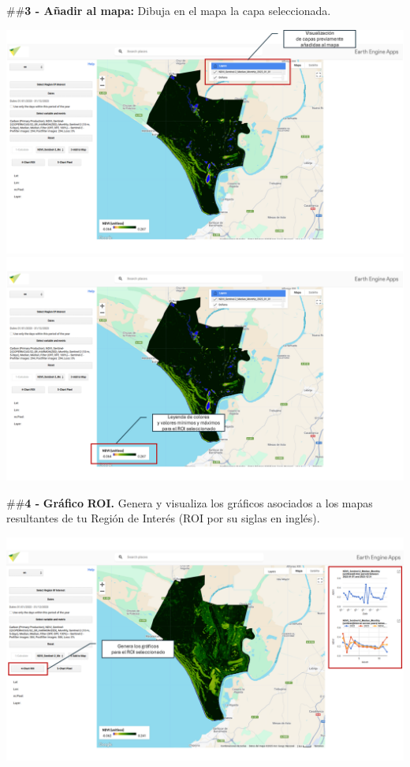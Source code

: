 \documentclass[
]{book}
\begin{document}
\#\#\textbf{3 - Añadir al mapa:} Dibuja en el mapa la capa seleccionada.

\includegraphics{assets/layers_es2.png}
\includegraphics{assets/leyenda_es.png}

\#\#\textbf{4 -} \textbf{Gráfico} \textbf{ROI.} Genera y visualiza los gráficos asociados a los mapas resultantes de tu Región de Interés (ROI por su siglas en inglés).

\includegraphics{assets/graphs_es.png}
\end{document}
